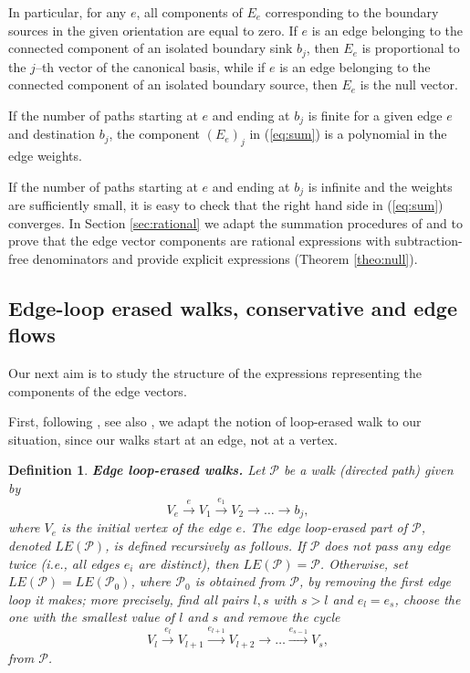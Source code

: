 \documentclass[11pt]{amsart}
\theoremstyle{plain}
\numberwithin{equation}{section}
\newtheorem{definition}{Definition}[subsection]
\begin{document}
In particular, for any $e$, all components of $E_e$ corresponding to the boundary 
sources in the given orientation are equal to zero. 
If $e$ is an edge belonging to the connected component of an isolated boundary sink $b_j$, 
then $E_e$ is proportional to the $j$--th vector of the canonical basis, while if $e$ is an edge belonging to the connected component of an isolated 
boundary source, then $E_e$ is the null vector.

If the number of paths starting at $e$ and ending at $b_j$ is finite for a given edge $e$ and destination $b_j$, the component $\left(E_{e}\right)_{j}$  
in (\ref{eq:sum}) is a polynomial in the edge weights.

If the number of paths starting at $e$ and ending at $b_j$ is infinite and the weights are sufficiently small, it is easy to check that the right hand side in (\ref{eq:sum}) converges. In Section \ref{sec:rational} we adapt the summation procedures of \cite{Pos} and \cite{Tal2} to prove that the edge vector components are rational expressions with subtraction-free denominators and provide explicit expressions (Theorem \ref{theo:null}). 

\subsection{Edge-loop erased walks, conservative and edge flows}\label{sec:flows}

Our next aim is to study the structure of the expressions representing the components of the edge vectors.

First, following \cite{Fom}, see also \cite{Law}, we adapt the notion of loop-erased walk to our situation, since our walks start at an edge, not at a vertex. 
\begin{definition}
\label{def:loop-erased-walk}
\textbf{Edge loop-erased walks.}  Let ${\mathcal P}$ be a walk (directed path) given by
$$
V_e \stackrel{e}{\rightarrow} V_1 \stackrel{e_1}{\rightarrow} V_2 \rightarrow \ldots \rightarrow b_j,
$$
where $V_e$ is the initial vertex of the edge $e$. The edge loop-erased part of  ${\mathcal P}$, denoted $LE({\mathcal P})$, is defined recursively as 
follows. If ${\mathcal P}$ does not pass any edge twice (i.e., all edges $e_i$ are distinct), then $LE({\mathcal P})={\mathcal P}$.
Otherwise, set $LE({\mathcal P})=LE({\mathcal P}_0)$, where ${\mathcal P}_0$ is obtained from ${\mathcal P}$, by removing the first
edge loop it makes; more precisely, find all pairs $l,s$ with $s>l$ and $e_l = e_s$, choose the one with the smallest value of $l$ and $s$ and remove the cycle
$$
V_l \stackrel{e_l}{\rightarrow} V_{l+1} \stackrel{e_{l+1}}\rightarrow V_{l+2} \rightarrow \ldots \stackrel{e_{s-1}}\rightarrow V_{s} ,
$$
from ${\mathcal P}$.
\end{definition}
\end{document}
